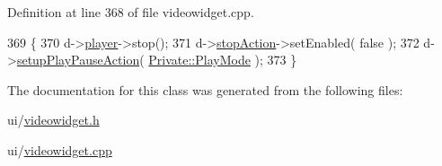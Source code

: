 Definition at line 368 of file videowidget.\+cpp.


\begin{DoxyCode}
369 \{
370     d->\hyperlink{classVideoWidget_1_1Private_ad25b2b9ba312490e52b2c21861aceaa1}{player}->stop();
371     d->\hyperlink{classVideoWidget_1_1Private_a1c5aa30fc3d0f10c2cb4f4f76eca14db}{stopAction}->setEnabled( \textcolor{keyword}{false} );
372     d->\hyperlink{classVideoWidget_1_1Private_a6f2d55d3df5ed98d793bf208b5128708}{setupPlayPauseAction}( \hyperlink{classVideoWidget_1_1Private_aa685363ecfd1874cfe0a9901cd86ede2a4211aefb1bf1a9dba29b939c6b811d33}{Private::PlayMode} );
373 \}
\end{DoxyCode}


The documentation for this class was generated from the following files\+:\begin{DoxyCompactItemize}
\item 
ui/\hyperlink{videowidget_8h}{videowidget.\+h}\item 
ui/\hyperlink{videowidget_8cpp}{videowidget.\+cpp}\end{DoxyCompactItemize}
